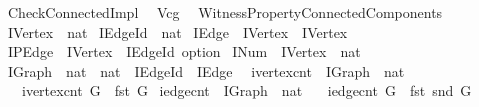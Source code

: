 %
\begin{isabellebody}%
\def\isabellecontext{Check{\isacharunderscore}Connected{\isacharunderscore}Impl}%
%
\isadelimtheory
%
\endisadelimtheory
%
\isatagtheory
{}\isamarkupfalse%
\ Check{\isacharunderscore}Connected{\isacharunderscore}Impl\isanewline
{}\isanewline
\ \ {\isachardoublequoteopen}Vcg{\isachardoublequoteclose}\isanewline
\ \ {\isachardoublequoteopen}{\isachardot}{\isachardot}{\isacharslash}Witness{\isacharunderscore}Property{\isacharslash}Connected{\isacharunderscore}Components{\isachardoublequoteclose}\isanewline
{}%
\endisatagtheory
{\isafoldtheory}%
%
\isadelimtheory
\isanewline
%
\endisadelimtheory
\isanewline
{}\isamarkupfalse%
\ IVertex\ {\isacharequal}\ nat\isanewline
{}\isamarkupfalse%
\ IEdge{\isacharunderscore}Id\ {\isacharequal}\ nat\isanewline
{}\isamarkupfalse%
\ IEdge\ {\isacharequal}\ {\isachardoublequoteopen}IVertex\ {\isasymtimes}\ IVertex{\isachardoublequoteclose}\isanewline
{}\isamarkupfalse%
\ IPEdge\ {\isacharequal}\ {\isachardoublequoteopen}IVertex\ {\isasymRightarrow}\ IEdge{\isacharunderscore}Id\ option{\isachardoublequoteclose}\isanewline
{}\isamarkupfalse%
\ INum\ {\isacharequal}\ {\isachardoublequoteopen}IVertex\ {\isasymRightarrow}\ nat{\isachardoublequoteclose}\isanewline
{}\isamarkupfalse%
\ IGraph\ {\isacharequal}\ {\isachardoublequoteopen}nat\ {\isasymtimes}\ nat\ {\isasymtimes}\ {\isacharparenleft}IEdge{\isacharunderscore}Id\ {\isasymRightarrow}\ IEdge{\isacharparenright}{\isachardoublequoteclose}\ \isanewline
\isanewline
{}\isamarkupfalse%
\ ivertex{\isacharunderscore}cnt\ {\isacharcolon}{\isacharcolon}\ {\isachardoublequoteopen}IGraph\ {\isasymRightarrow}\ nat{\isachardoublequoteclose}\isanewline
\ \ \ {\isachardoublequoteopen}ivertex{\isacharunderscore}cnt\ G\ {\isasymequiv}\ fst\ G{\isachardoublequoteclose}\isanewline
\isanewline
{}\isamarkupfalse%
\ iedge{\isacharunderscore}cnt\ {\isacharcolon}{\isacharcolon}\ {\isachardoublequoteopen}IGraph\ {\isasymRightarrow}\ nat{\isachardoublequoteclose}\isanewline
\ \ \ {\isachardoublequoteopen}iedge{\isacharunderscore}cnt\ G\ {\isasymequiv}\ fst\ {\isacharparenleft}snd\ G{\isacharparenright}{\isachardoublequoteclose}\isanewline
\isanewline
{}\isamarkupfalse%

\end{isabellebody}
